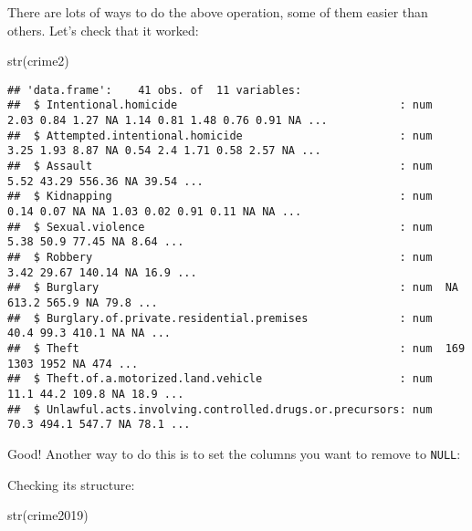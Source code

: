 \documentclass[
]{article}
\newenvironment{Shaded}{\begin{snugshade}}{\end{snugshade}}
\newcommand{\ConstantTok}[1]{\textcolor[rgb]{0.00,0.00,0.00}{#1}}
\newcommand{\FunctionTok}[1]{\textcolor[rgb]{0.00,0.00,0.00}{#1}}
\newcommand{\NormalTok}[1]{#1}
\newcommand{\OtherTok}[1]{\textcolor[rgb]{0.56,0.35,0.01}{#1}}
\newcommand{\SpecialCharTok}[1]{\textcolor[rgb]{0.00,0.00,0.00}{#1}}
\begin{document}
There are lots of ways to do the above operation, some of them easier
than others. Let's check that it worked:

\begin{Shaded}
\begin{Highlighting}[]
\FunctionTok{str}\NormalTok{(crime2)}
\end{Highlighting}
\end{Shaded}

\begin{verbatim}
## 'data.frame':    41 obs. of  11 variables:
##  $ Intentional.homicide                                  : num  2.03 0.84 1.27 NA 1.14 0.81 1.48 0.76 0.91 NA ...
##  $ Attempted.intentional.homicide                        : num  3.25 1.93 8.87 NA 0.54 2.4 1.71 0.58 2.57 NA ...
##  $ Assault                                               : num  5.52 43.29 556.36 NA 39.54 ...
##  $ Kidnapping                                            : num  0.14 0.07 NA NA 1.03 0.02 0.91 0.11 NA NA ...
##  $ Sexual.violence                                       : num  5.38 50.9 77.45 NA 8.64 ...
##  $ Robbery                                               : num  3.42 29.67 140.14 NA 16.9 ...
##  $ Burglary                                              : num  NA 613.2 565.9 NA 79.8 ...
##  $ Burglary.of.private.residential.premises              : num  40.4 99.3 410.1 NA NA ...
##  $ Theft                                                 : num  169 1303 1952 NA 474 ...
##  $ Theft.of.a.motorized.land.vehicle                     : num  11.1 44.2 109.8 NA 18.9 ...
##  $ Unlawful.acts.involving.controlled.drugs.or.precursors: num  70.3 494.1 547.7 NA 78.1 ...
\end{verbatim}

Good! Another way to do this is to set the columns you want to remove to
\texttt{NULL}:

\begin{Shaded}
\end{Shaded}

Checking its structure:

\begin{Shaded}
\begin{Highlighting}[]
\FunctionTok{str}\NormalTok{(crime2019)}
\end{Highlighting}
\end{Shaded}
\end{document}
